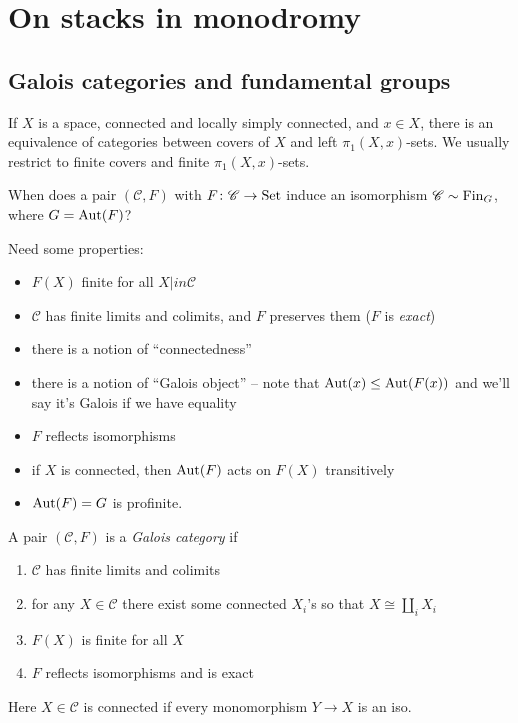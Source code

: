 \documentclass[11pt]{amsart}
\begin{document}
\section{On stacks in monodromy}

\subsection{Galois categories and fundamental groups}

If $X$ is a space, connected and locally simply connected, and $x\in X$, there is an equivalence of categories between covers of $X$ and left $\pi_1(X,x)$-sets. We usually restrict to finite covers and finite $\pi_1(X,x)$-sets.

\begin{question} When does a pair $(\mathscr{C},F)$ with $F \colon \mathscr{C} \to \mathrm{Set}$ induce an isomorphism $\mathscr{C} \sim \mathrm{Fin}_G$, where $G = \mathrm{Aut}(F)$?
\end{question}
Need some properties:
\begin{itemize}
    \item $F(X)$ finite for all $X|in \mathscr{C}$
    \item $\mathscr{C}$ has finite limits and colimits, and $F$ preserves them ($F$ is \textit{exact})
    \item there is a notion of ``connectedness''
    \item there is a notion of ``Galois object'' -- note that $\mathrm{Aut}(x) \le \mathrm{Aut}(F(x))$ and we'll say it's Galois if we have equality
    \item $F$ reflects isomorphisms
    \item if $X$ is connected, then $\mathrm{Aut}(F)$ acts on $F(X)$ transitively
    \item $\mathrm{Aut}(F) = G$ is profinite.
\end{itemize}

\begin{definition} A pair $(\mathscr{C},F)$ is a \textit{Galois category} if
\begin{enumerate}
    \item $\mathscr{C}$ has finite limits and colimits
    \item for any $X \in \mathscr{C}$ there exist some connected $X_i$'s so that $X \cong \amalg_i X_i$
    \item $F(X)$ is finite for all $X$
    \item $F$ reflects isomorphisms and is exact
\end{enumerate}
Here $X\in \mathscr{C}$ is connected if every monomorphism $Y \to X$ is an iso.
\end{definition}
\end{document}
